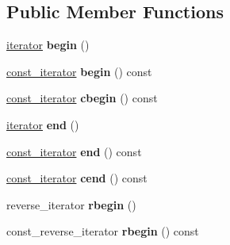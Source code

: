 \subsection*{Public Member Functions}
\begin{DoxyCompactItemize}
\item 
\hypertarget{classcircularDeque_a9dc797d3cfe2d6c029155e7859a5f48f}{\hyperlink{classcircularDeque_1_1iterator}{iterator} {\bfseries begin} ()}\label{classcircularDeque_a9dc797d3cfe2d6c029155e7859a5f48f}

\item 
\hypertarget{classcircularDeque_a3ae2a586b0eb77f6aff1e5173a4ee10b}{\hyperlink{classcircularDeque_1_1const__iterator}{const\+\_\+iterator} {\bfseries begin} () const }\label{classcircularDeque_a3ae2a586b0eb77f6aff1e5173a4ee10b}

\item 
\hypertarget{classcircularDeque_a3f824eb07d79d73f6a9cbda89b642282}{\hyperlink{classcircularDeque_1_1const__iterator}{const\+\_\+iterator} {\bfseries cbegin} () const }\label{classcircularDeque_a3f824eb07d79d73f6a9cbda89b642282}

\item 
\hypertarget{classcircularDeque_a8c37bcb20930c20159d8b147e8aa5b09}{\hyperlink{classcircularDeque_1_1iterator}{iterator} {\bfseries end} ()}\label{classcircularDeque_a8c37bcb20930c20159d8b147e8aa5b09}

\item 
\hypertarget{classcircularDeque_a0c6429b40e230385343c6266137a3df3}{\hyperlink{classcircularDeque_1_1const__iterator}{const\+\_\+iterator} {\bfseries end} () const }\label{classcircularDeque_a0c6429b40e230385343c6266137a3df3}

\item 
\hypertarget{classcircularDeque_abf11c31d601e9b5d215ec7786b19ab38}{\hyperlink{classcircularDeque_1_1const__iterator}{const\+\_\+iterator} {\bfseries cend} () const }\label{classcircularDeque_abf11c31d601e9b5d215ec7786b19ab38}

\item 
\hypertarget{classcircularDeque_a71ea96298156bb3f548050905f9ae12c}{reverse\+\_\+iterator {\bfseries rbegin} ()}\label{classcircularDeque_a71ea96298156bb3f548050905f9ae12c}

\item 
\hypertarget{classcircularDeque_aaaeecc0c198f83788940b906c20334d8}{const\+\_\+reverse\+\_\+iterator {\bfseries rbegin} () const }\label{classcircularDeque_aaaeecc0c198f83788940b906c20334d8}


\end{DoxyCompactItemize}
